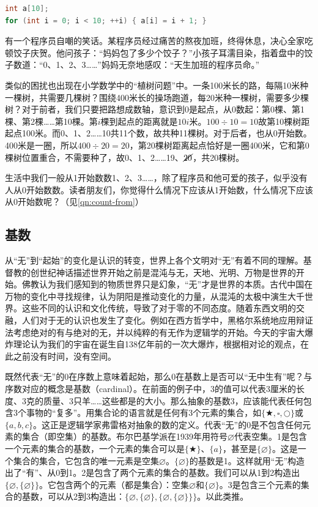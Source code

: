 \documentclass[b5paper]{ctexart}
\begin{document}
\begin{lstlisting}[language=C, frame=single]
int a[10];
for (int i = 0; i < 10; ++i) { a[i] = i + 1; }
\end{lstlisting}

有一个程序员自嘲的笑话。某程序员经过痛苦的熬夜加班，终得休息，决心全家吃顿饺子庆贺。他问孩子：“妈妈包了多少个饺子？”小孩子耳濡目染，指着盘中的饺子数道：“0、1、2、3……”妈妈无奈地感叹：“天生加班的程序员命。”

类似的困扰也出现在小学数学中的“植树问题”中。一条100米长的路，每隔10米种一棵树，共需要几棵树？围绕400米长的操场跑道，每20米种一棵树，需要多少棵树？对于前者，我们只要把路想成数轴，意识到0是起点，从0数起：第0棵、第1棵、第2棵……第10棵。第$i$棵到起点的距离就是$10i$米。$100 \div 10 = 10$故第10棵树距起点100米。而0、1、2……10共11个数，故共种11棵树。对于后者，也从0开始数。400米是一圈，所以$400 \div 20 = 20$，第20棵树距离起点恰好是一圈400米，它和第0棵树位置重合，不需要种了，故0、1、2……19、$\cancel{20}$，共20棵树。

生活中我们一般从1开始数数1、2、3……，除了程序员和他可爱的孩子，似乎没有人从0开始数数。读者朋友们，你觉得什么情况下应该从1开始数，什么情况下应该从0开始数呢？（见\cref{qn:count-from}）

\subsection{基数}

从“无”到“起始”的变化是认识的转变，世界上各个文明对“无”有着不同的理解。基督教的创世纪神话描述世界开始之前是混沌与无，天地、光明、万物是世界的开始。佛教认为我们感知到的物质世界只是幻象，“无”才是世界的本质。古代中国在万物的变化中寻找规律，认为阴阳是推动变化的力量，从混沌的太极中演生大千世界。这些不同的认识和文化传统，导致了对于零的不同态度。随着东西文明的交融，人们对于无的认识也发生了变化。例如在西方哲学中，黑格尔系统地应用辩证法考虑绝对的有与绝对的无，并以纯粹的有无作为逻辑学的开始。今天的宇宙大爆炸理论认为我们的宇宙在诞生自138亿年前的一次大爆炸，根据相对论的观点，在此之前没有时间，没有空间。

 
既然代表“无”的0在序数上意味着起始，那么0在基数上是否可以“无中生有”呢？与序数对应的概念是基数（cardinal）。在前面的例子中，3的值可以代表3厘米的长度、3克的质量、3只羊……这些都是的大小。那么抽象的基数3，应该能代表任何包含3个事物的“复多”。用集合论的语言就是任何有3个元素的集合，如$\{\bigstar, \square, \bigcirc \}$或$\{a, b, c\}$。这正是逻辑学家弗雷格对抽象的数的定义。代表“无”的0是不包含任何元素的集合（即空集）的基数。布尔巴基学派在1939年用符号$\varnothing$代表空集。1是包含一个元素的集合的基数，一个元素的集合可以是$\{ \bigstar \}$、$\{ a \}$，甚至是$\{ \varnothing \}$。这是一个集合的集合，它包含的唯一元素是空集$\varnothing$。$\{ \varnothing \}$的基数是1。这样就用“无”构造出了“有”、从0到1。2是包含了两个元素的集合的基数。我们可以从1到2构造出$\{ \varnothing, \{ \varnothing \} \}$。它包含两个的元素（都是集合）：空集$\varnothing$和$\{ \varnothing \}$。3是包含三个元素的集合的基数，可以从2到3构造出：$\{ \varnothing, \{ \varnothing \}, \{ \varnothing, \{ \varnothing \} \}\}$。以此类推。
\end{document}
